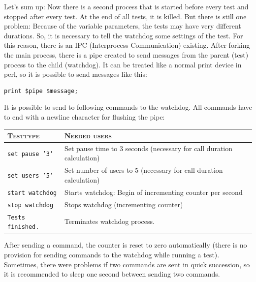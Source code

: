 Let's sum up: Now there is a second process that is started before every test and stopped after every test.
At the end of all tests, it is killed. But there is still one problem: Because of the variable parameters,
the tests may have very different durations. So, it is necessary to tell the watchdog some settings of the test.
For this reason, there is an IPC (Interprocess Communication) existing. After forking the main process, there
is a pipe created to send messages from the parent (test) process to the child (watchdog). It can be treated
like a normal print device in perl, so it is possible to send messages like this:

\begin{lstlisting}[breaklines=true,label=code:watchdog-pipe,caption={Send messages to watchdog} ]
print $pipe $message;
\end{lstlisting}

It is possible to send to following commands to the watchdog. All commands have to end with a newline character
for flushing the pipe:

\begin{tabular}{|p{3.5cm}|p{10.5cm}|} \hline
\textsc{Testtype} & \textsc{Needed users} \\ \hline \hline
\texttt{set pause '3'}		& Set pause time to 3 seconds \newline (necessary for call duration calculation) \\
\texttt{set users '5'}		& Set number of users to 5 \newline (necessary for call duration calculation) \\
\texttt{start watchdog}		& Starts watchdog: Begin of incrementing counter per second \\
\texttt{stop watchdog}		& Stops watchdog (incrementing counter) \\
\texttt{Tests finished.}	& Terminates watchdog process. \\
\hline
\end{tabular}

After sending a command, the counter is reset to zero automatically (there is no provision for sending commands
to the watchdog while running a test). Sometimes, there were problems if two commands are sent in quick succession, 
so it is recommended to sleep one second between sending two commands.

